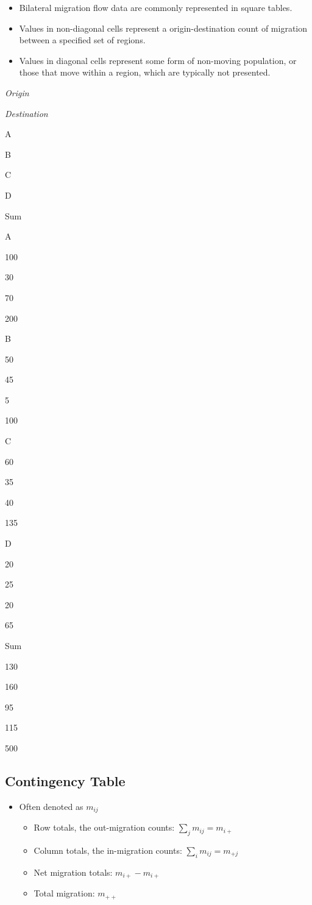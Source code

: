 \documentclass[
]{book}
\providecommand{\tightlist}{%
  \setlength{\itemsep}{0pt}\setlength{\parskip}{0pt}}
\begin{document}
\begin{itemize}
\tightlist
\item
  Bilateral migration flow data are commonly represented in square tables.
\item
  Values in non-diagonal cells represent a origin-destination count of migration between a specified set of regions.
\item
  Values in diagonal cells represent some form of non-moving population, or those that move within a region, which are typically not presented.
\end{itemize}

\emph{Origin}

\emph{Destination}

A

B

C

D

Sum

A

100

30

70

200

B

50

45

5

100

C

60

35

40

135

D

20

25

20

65

Sum

130

160

95

115

500

\hypertarget{contingency-table-2}{%
\subsection{Contingency Table}\label{contingency-table-2}}

\begin{itemize}
\tightlist
\item
  Often denoted as \(m_{ij}\)

  \begin{itemize}
  \tightlist
  \item
    Row totals, the out-migration counts: \(\sum_j m_{ij} = m_{i+}\)
  \item
    Column totals, the in-migration counts: \(\sum_i m_{ij} = m_{+j}\)
  \item
    Net migration totals: \(m_{i+} - m_{i+}\)
  \item
    Total migration: \(m_{++}\)
  \end{itemize}
\end{itemize}
\end{document}

